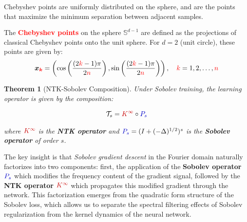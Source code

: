 \documentclass[a4paper]{article}
\newcommand{\Kinf}{\textcolor{kernelcolor}{K^{\infty}}}
\newcommand{\Ps}{\textcolor{sobolevcolor}{P_s}}
\newcommand{\Ts}{\mathcal{T}_s}
\theoremstyle{plain}
\newtheorem{theorem}{Theorem}[section]
\theoremstyle{definition}
\theoremstyle{remark}
\begin{document}
Chebyshev points are uniformly distributed on the sphere, and are the points that maximize the minimum separation between adjacent samples.

\begin{tcolorbox}[colback=yellow!10,colframe=orange!60!black,title=Definition: Chebyshev Points on the Sphere]
The \textcolor{red}{\textbf{Chebyshev points}} on the sphere $\mathbb{S}^{d-1}$ are defined as the projections of classical Chebyshev points onto the unit sphere. For $d = 2$ (unit circle), these points are given by:
\begin{equation}
\label{eq:chebyshev_circle}
\boldsymbol{x_{\textcolor{red}{k}}} = \left(\cos\left(\frac{(2\textcolor{red}{k}-1)\pi}{2\textcolor{red}{n}}\right), \sin\left(\frac{(2\textcolor{red}{k}-1)\pi}{2\textcolor{red}{n}}\right)\right), \quad \textcolor{red}{k} = 1, 2, \ldots, \textcolor{red}{n}
\end{equation}

\end{tcolorbox}


\begin{theorem}[NTK-Sobolev Composition]
\label{thm:ntk_sobolev_composition}
Under \textit{Sobolev training}, the learning operator is given by the composition:
\begin{tcolorbox}[colback=purple!5,colframe=purple!60!black,title=Learning Operator Composition]
\begin{equation}
\label{eq:learning_operator}
\Ts = \Kinf \circ \Ps
\end{equation}
\end{tcolorbox}
where $\Kinf$ is the \textcolor{kernelcolor}{\textbf{NTK operator}} and $\Ps = (I + (-\Delta)^{1/2})^s$ is the \textcolor{sobolevcolor}{\textbf{Sobolev operator}} of order $s$.
\end{theorem}

\begin{tcolorbox}[colback=green!10,colframe=green!60!black,title={\textbf{Insight : Factorization of Learning Dynamics}},enhanced,drop shadow]
    The key insight is that \textit{Sobolev gradient descent} in the Fourier domain naturally factorizes into two components: first, the application of the \textcolor{sobolevcolor}{\textbf{Sobolev operator}} $\Ps$ which modifies the frequency content of the gradient signal, followed by the \textcolor{kernelcolor}{\textbf{NTK operator}} $\Kinf$ which propagates this modified gradient through the network. This factorization emerges from the quadratic form structure of the Sobolev loss, which allows us to separate the spectral filtering effects of Sobolev regularization from the kernel dynamics of the neural network.
\end{tcolorbox}
\end{document}

